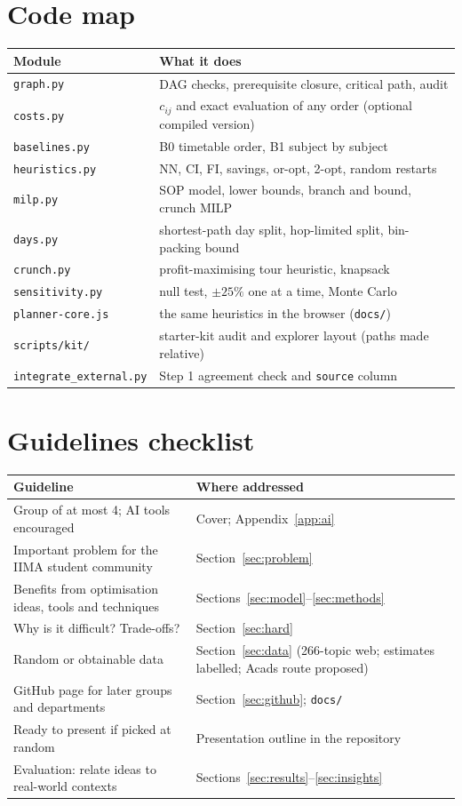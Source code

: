 \documentclass[11pt,a4paper]{article}
\begin{document}
\section{Code map}
\begin{tabular}{@{}p{4.2cm}p{10cm}@{}}
\toprule
Module & What it does\\
\midrule
\texttt{graph.py} & DAG checks, prerequisite closure, critical path, audit\\
\texttt{costs.py} & $c_{ij}$ and exact evaluation of any order (optional compiled version)\\
\texttt{baselines.py} & B0 timetable order, B1 subject by subject\\
\texttt{heuristics.py} & NN, CI, FI, savings, or-opt, 2-opt, random restarts\\
\texttt{milp.py} & SOP model, lower bounds, branch and bound, crunch MILP\\
\texttt{days.py} & shortest-path day split, hop-limited split, bin-packing bound\\
\texttt{crunch.py} & profit-maximising tour heuristic, knapsack\\
\texttt{sensitivity.py} & null test, $\pm25\%$ one at a time, Monte Carlo\\
\texttt{planner-core.js} & the same heuristics in the browser (\texttt{docs/})\\
\texttt{scripts/kit/} & starter-kit audit and explorer layout (paths made relative)\\
\texttt{integrate\_external.py} & Step 1 agreement check and \texttt{source} column\\
\bottomrule
\end{tabular}

\section{Guidelines checklist}
\begin{tabular}{@{}p{7.2cm}p{7cm}@{}}
\toprule
Guideline & Where addressed\\
\midrule
Group of at most 4; AI tools encouraged & Cover; Appendix~\ref{app:ai}\\
Important problem for the IIMA student community & Section~\ref{sec:problem}\\
Benefits from optimisation ideas, tools and techniques & Sections~\ref{sec:model}--\ref{sec:methods}\\
Why is it difficult? Trade-offs? & Section~\ref{sec:hard}\\
Random or obtainable data & Section~\ref{sec:data} (266-topic web; estimates labelled; Acads route proposed)\\
GitHub page for later groups and departments & Section~\ref{sec:github}; \texttt{docs/}\\
Ready to present if picked at random & Presentation outline in the repository\\
Evaluation: relate ideas to real-world contexts & Sections~\ref{sec:results}--\ref{sec:insights}\\
\bottomrule
\end{tabular}
\end{document}
